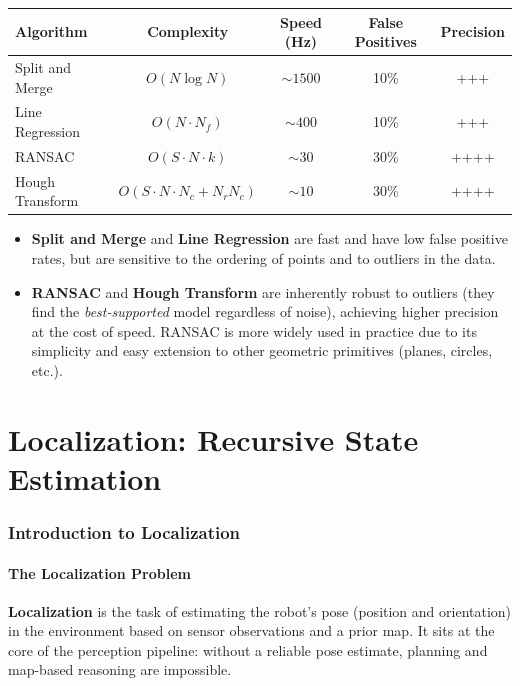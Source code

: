 \documentclass[11pt,a4paper]{article}
\theoremstyle{definition}
\theoremstyle{plain}
\theoremstyle{remark}
\begin{document}
\begin{center}
\begin{tabular}{lcccc}
\hline
\textbf{Algorithm} & \textbf{Complexity} & \textbf{Speed (Hz)} & \textbf{False Positives} & \textbf{Precision} \\
\hline
Split and Merge    & $O(N \log N)$                     & $\sim 1500$ & 10\%  & +++ \\
Line Regression    & $O(N \cdot N_f)$                  & $\sim 400$  & 10\%  & +++ \\
RANSAC             & $O(S \cdot N \cdot k)$             & $\sim 30$   & 30\%  & ++++ \\
Hough Transform    & $O(S \cdot N \cdot N_c + N_r N_c)$& $\sim 10$   & 30\%  & ++++ \\
\hline
\end{tabular}
\end{center}

\begin{itemize}
    \item \textbf{Split and Merge} and \textbf{Line Regression} are fast and have low false positive rates, but are sensitive to the ordering of points and to outliers in the data.
    \item \textbf{RANSAC} and \textbf{Hough Transform} are inherently robust to outliers (they find the \textit{best-supported} model regardless of noise), achieving higher precision at the cost of speed. RANSAC is more widely used in practice due to its simplicity and easy extension to other geometric primitives (planes, circles, etc.).
\end{itemize}



\part{Localization: Recursive State Estimation}

\section{Introduction to Localization}

\subsection{The Localization Problem}

\textbf{Localization} is the task of estimating the robot's pose (position and orientation) in the environment based on sensor observations and a prior map. It sits at the core of the perception pipeline: without a reliable pose estimate, planning and map-based reasoning are impossible.
\end{document}
